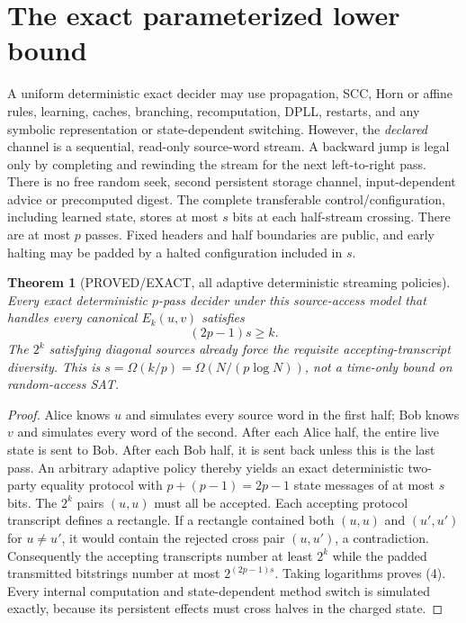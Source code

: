 \documentclass[11pt]{article}
\newtheorem{theorem}{Theorem}
\begin{document}
\section{The exact parameterized lower bound}
A uniform deterministic exact decider may use propagation, SCC, Horn or affine rules, learning, caches, branching, recomputation, DPLL, restarts, and any symbolic representation or state-dependent switching. However, the \emph{declared} channel is a sequential, read-only source-word stream. A backward jump is legal only by completing and rewinding the stream for the next left-to-right pass. There is no free random seek, second persistent storage channel, input-dependent advice or precomputed digest. The complete transferable control/configuration, including learned state, stores at most $s$ bits at each half-stream crossing. There are at most $p$ passes. Fixed headers and half boundaries are public, and early halting may be padded by a halted configuration included in $s$.

\begin{theorem}[PROVED/EXACT, all adaptive deterministic streaming policies]\label{th:pass}
Every exact deterministic $p$-pass decider under this source-access model that handles every canonical $E_k(u,v)$ satisfies
\[
\boxed{(2p-1)s\ge k.}
\tag{4}
\]
The $2^k$ satisfying diagonal sources already force the requisite accepting-transcript diversity. This is $s=\Omega(k/p)=\Omega(N/(p\log N))$, not a time-only bound on random-access SAT.
\end{theorem}
\begin{proof}
Alice knows $u$ and simulates every source word in the first half; Bob knows $v$ and simulates every word of the second. After each Alice half, the entire live state is sent to Bob. After each Bob half, it is sent back unless this is the last pass. An arbitrary adaptive policy thereby yields an exact deterministic two-party equality protocol with $p+(p-1)=2p-1$ state messages of at most $s$ bits. The $2^k$ pairs $(u,u)$ must all be accepted. Each accepting protocol transcript defines a rectangle. If a rectangle contained both $(u,u)$ and $(u',u')$ for $u\ne u'$, it would contain the rejected cross pair $(u,u')$, a contradiction. Consequently the accepting transcripts number at least $2^k$ while the padded transmitted bitstrings number at most $2^{(2p-1)s}$. Taking logarithms proves (4). Every internal computation and state-dependent method switch is simulated exactly, because its persistent effects must cross halves in the charged state.
\end{proof}
\end{document}
